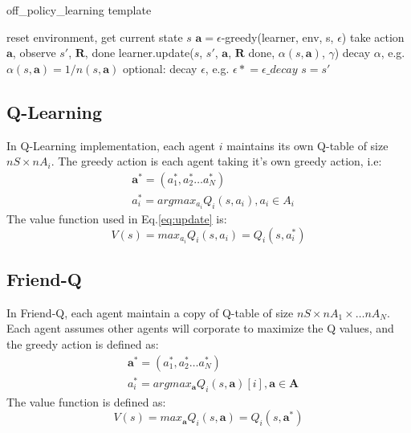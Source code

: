 \documentclass[conference]{IEEEtran}
\newcommand{\asteq}{\mathrel{*}=}
\begin{document}
\begin{algorithm}[h!]
	\caption{off\_policy\_learning template}
	\begin{algorithmic}
				\State reset environment, get current state $s$
					\State $\mathbf{a} = \epsilon$-greedy(learner, env, s, $\epsilon$)
					\State take action $\mathbf{a}$, observe $s'$, $\mathbf{R}$, done
					\State learner.update($s$, $s'$, $\mathbf{a}$, $\mathbf{R}$ done, $\alpha(s,\mathbf{a})$, $\gamma$)
				    \State decay $\alpha$, e.g. $\alpha(s,\mathbf{a}) = 1/n(s,\mathbf{a})$
				    \State optional: decay $\epsilon$, e.g. $\epsilon \asteq \epsilon\_decay$
				    \State $s=s'$
				\EndFor			
			\EndFor
		\EndFunction
	\end{algorithmic}
	\label{algo:learning}
\end{algorithm}

\subsection{Q-Learning}
In Q-Learning implementation, each agent $i$ maintains its own Q-table of size $nS\times nA_i$. The greedy action is each agent taking it's own greedy action, i.e:
\begin{align*}
& \mathbf{a^*} = (a_1^*, a_2^* \dots a_N^*) \\
& a_i^* = argmax_{a_i} Q_i(s, a_i), a_i \in A_i
\end{align*}
The value function used in Eq.\ref{eq:update} is:
\begin{equation}
V(s) = max_{a_i} Q_i(s, a_i) = Q_i(s, a_i^*)
\end{equation}

\subsection{Friend-Q}
In Friend-Q, each agent maintain a copy of Q-table of size $nS\times nA_1 \times\dots nA_N$. Each agent assumes other agents will corporate to maximize the Q values, and the greedy action is defined as:
\begin{align*}
& \mathbf{a^*} = (a_1^*, a_2^* \dots a_N^*) \\
& a_i^* = argmax_{\mathbf{a}} Q_i(s, \mathbf{a})[i], \mathbf{a} \in \mathbf{A}
\end{align*}
The value function is defined as:
\begin{equation}
V(s) = max_{\mathbf{a} } Q_i(s,  \mathbf{a})  = Q_i(s, \mathbf{a^*})
\end{equation}
\end{document}
